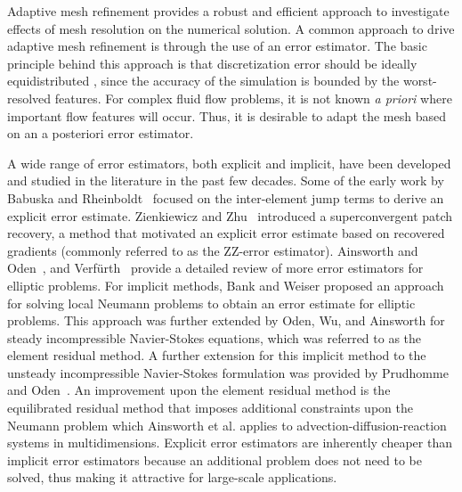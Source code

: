 Adaptive mesh refinement provides a robust and efficient approach to investigate effects of mesh resolution on the numerical solution.
A common approach to drive adaptive mesh refinement is through the use of an error estimator.
The basic principle behind this approach is that discretization error should be ideally equidistributed \cite{baker1997mesh}, since the accuracy of the simulation is bounded by the worst-resolved features.
For complex fluid flow problems, it is not known \textit{a priori} where important flow features will occur. Thus, it is desirable to adapt the mesh based on an a posteriori error estimator.

A wide range of error estimators, both explicit and implicit, have been developed and studied in the literature in the past few decades.
Some of the early work by Babuska and Rheinboldt~\cite{babuvska1978posteriori} focused on the inter-element jump terms to derive an explicit error estimate.
Zienkiewicz and Zhu~\cite{zienkiewicz1992superconvergent1,zienkiewicz1992superconvergent2} introduced a superconvergent patch recovery, a method that motivated an explicit error estimate based on recovered gradients (commonly referred to as the ZZ-error estimator).
Ainsworth and Oden~\cite{ainsworth2011book}, and Verf\"urth~\cite{verfurth1994posteriori} provide a detailed review of more error estimators for elliptic problems.
For implicit methods, Bank and Weiser \cite{bank1985some} proposed an approach for solving local Neumann problems to obtain an error estimate for elliptic problems.
This approach was further extended by Oden, Wu, and Ainsworth \cite{oden1994posteriori} for steady incompressible Navier-Stokes equations, which was referred to as the element residual method.
A further extension for this implicit method to the unsteady incompressible Navier-Stokes formulation was provided by Prudhomme and Oden~\cite{prudhomme1999posteriori}.
An improvement upon the element residual method is the equilibrated residual method that imposes additional constraints upon the Neumann problem which Ainsworth et al.\cite{ainsworth2013fully} applies to advection-diffusion-reaction systems in multidimensions.
Explicit error estimators are inherently cheaper than implicit error estimators because an additional problem does not need to be solved, thus making it attractive for large-scale applications.

